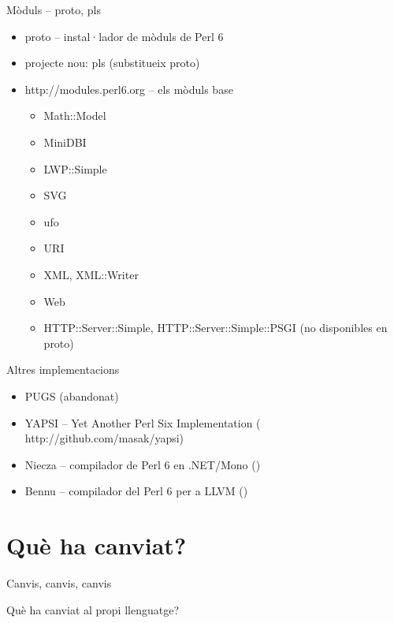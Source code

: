 \documentclass{beamer}
\begin{document}
\begin{frame}{Mòduls -- proto, pls}
	\begin{itemize}
		\item proto -- instal·lador de mòduls de Perl 6
		\item projecte nou: pls (substitueix proto)
		\item {}
			{http://modules.perl6.org} -- els mòduls base
		\begin{itemize}
			\item Math::Model
			\item MiniDBI
			\item LWP::Simple
			\item SVG
			\item ufo
			\item URI
			\item XML, XML::Writer
			\item Web
			\item HTTP::Server::Simple, HTTP::Server::Simple::PSGI (no disponibles en proto)
		\end{itemize}
	\end{itemize}
\end{frame}

\begin{frame}{Altres implementacions}
	\begin{itemize}
		\item PUGS (abandonat)
		\item YAPSI -- Yet Another Perl Six Implementation
			(
			{http://github.com/masak/yapsi})
		\item Niecza -- compilador de Perl 6 en .NET/Mono ()
		\item Bennu -- compilador del Perl 6 per a LLVM ()
	\end{itemize}
\end{frame}
			\section{Què ha canviat?}

\begin{frame}{Canvis, canvis, canvis}
	\begin{center}
	{\huge Què ha canviat al propi llenguatge?}
	\end{center}
\end{frame}
\end{document}
